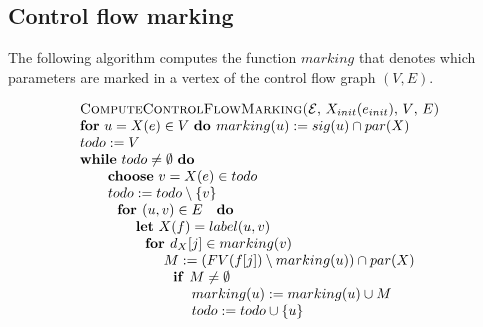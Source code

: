 \documentclass{article}
\begin{document}
\newpage

\subsection{\protect\bigskip Control flow marking}

The following algorithm computes the function $marking$ that denotes which
parameters are marked in a vertex of the control flow graph $(V,E)$.

\begin{equation*}
\begin{tabular}{l}
\textsc{ComputeControlFlowMarking(}$\mathcal{E}$, $X_{init}(e_{init})$, $V$, 
$E$\textsc{)} \\ 
\textbf{for} $u=X(e)\in V$ \textbf{do }$marking(u):=sig(u)\cap par(X)$ \\ 
$todo:=V$ \\ 
\textbf{while} $todo\neq \emptyset $ \textbf{do} \\ 
$\qquad $\textbf{choose} $v=X(e)\in todo$ \\ 
$\qquad todo:=todo\setminus \{v\}$ \\ 
$\qquad \text{\textbf{for }}(u,v)\in E\text{ \textbf{do}}$ \\ 
$\qquad \qquad $\textbf{let} $X(f)=label(u,v)$ \\ 
$\qquad \qquad \text{\textbf{for }}d_{X}[j]\in marking(v)$ \\ 
$\qquad \qquad \qquad M:=(FV(f[j])\setminus marking(u))\cap par(X)$ \\ 
$\qquad \qquad \qquad \text{\textbf{if }}M\neq \emptyset $ \\ 
$\qquad \qquad \qquad \qquad marking(u):=marking(u)\cup M$ \\ 
$\qquad \qquad \qquad \qquad todo:=todo\cup \{u\}$%
\end{tabular}%
\end{equation*}
\end{document}
